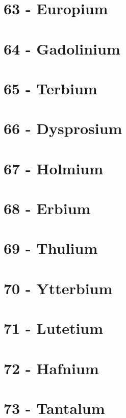 \documentclass{book}
\begin{document}
\section{63 - Europium}
\label{sec:elem-europium}

\section{64 - Gadolinium}
\label{sec:elem-gadolinium}

\section{65 - Terbium}
\label{sec:elem-terbium}

\section{66 - Dysprosium}
\label{sec:elem-dysprosium}

\section{67 - Holmium}
\label{sec:elem-holmium}

\section{68 - Erbium}
\label{sec:elem-erbium}

\section{69 - Thulium}
\label{sec:elem-thulium}

\section{70 - Ytterbium}
\label{sec:elem-ytterbium}

\section{71 - Lutetium}
\label{sec:elem-lutetium}

\section{72 - Hafnium}
\label{sec:elem-hafnium}

\section{73 - Tantalum}
\label{sec:elem-tantalum}
\end{document}
